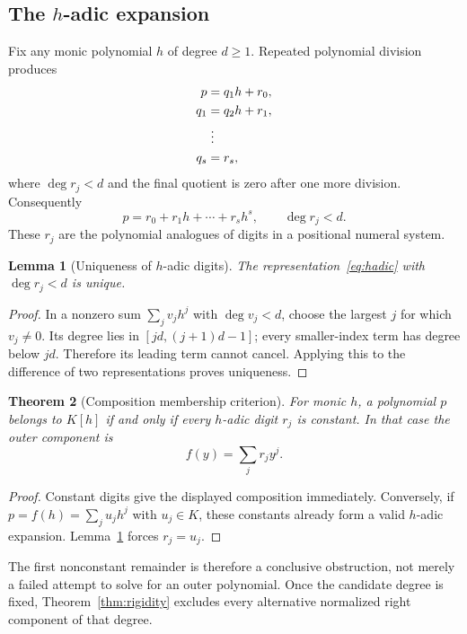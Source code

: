 \documentclass[11pt,letterpaper]{article}
\newtheorem{theorem}{Theorem}[section]
\newtheorem{lemma}[theorem]{Lemma}
\theoremstyle{definition}
\theoremstyle{remark}
\begin{document}
\subsection{The \texorpdfstring{$h$}{h}-adic expansion}
Fix any monic polynomial $h$ of degree $d\geq1$. Repeated polynomial
division produces
\begin{align*}
 p&=q_1h+r_0,\\
 q_1&=q_2h+r_1,\\
 &\hspace{0.3em}\vdots\\
 q_s&=r_s,
\end{align*}
where $\deg r_j<d$ and the final quotient is zero after one more division.
Consequently
\begin{equation}\label{eq:hadic}
 p=r_0+r_1h+\cdots+r_sh^s,\qquad \deg r_j<d.
\end{equation}
These $r_j$ are the polynomial analogues of digits in a positional
numeral system.

\begin{lemma}[Uniqueness of $h$-adic digits]\label{lem:digits}
The representation~\eqref{eq:hadic} with $\deg r_j<d$ is unique.
\end{lemma}

\begin{proof}
In a nonzero sum $\sum_jv_jh^j$ with $\deg v_j<d$, choose the largest
$j$ for which $v_j\ne0$. Its degree lies in $[jd,(j+1)d-1]$; every
smaller-index term has degree below $jd$. Therefore its leading term
cannot cancel. Applying this to the difference of two representations
proves uniqueness.
\end{proof}

\begin{theorem}[Composition membership criterion]\label{thm:membership}
For monic $h$, a polynomial $p$ belongs to $K[h]$ if and only if every
$h$-adic digit $r_j$ is constant. In that case the outer component is
\[
 f(y)=\sum_j r_jy^j.
\]
\end{theorem}

\begin{proof}
Constant digits give the displayed composition immediately. Conversely,
if $p=f(h)=\sum_j u_jh^j$ with $u_j\in K$, these constants already form
a valid $h$-adic expansion. Lemma~\ref{lem:digits} forces $r_j=u_j$.
\end{proof}

The first nonconstant remainder is therefore a conclusive obstruction,
not merely a failed attempt to solve for an outer polynomial. Once the
candidate degree is fixed, Theorem~\ref{thm:rigidity} excludes every
alternative normalized right component of that degree.
\end{document}
